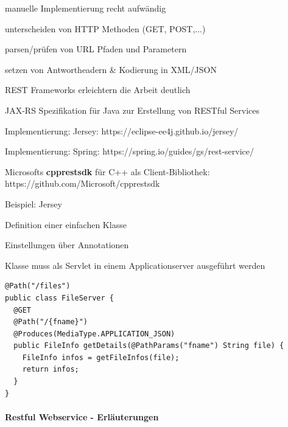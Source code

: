 \documentclass[10pt]{article}
\begin{document}
\begin{itemize*}
  \item manuelle Implementierung recht aufwändig
  \begin{itemize*}
    \item unterscheiden von HTTP Methoden (GET, POST,...)
    \item parsen/prüfen von URL Pfaden und Parametern
    \item setzen von Antwortheadern \& Kodierung in XML/JSON
  \end{itemize*}
  \item REST Frameworks erleichtern die Arbeit deutlich
  \begin{itemize*}
    \item JAX-RS Spezifikation für Java zur Erstellung von RESTful Services
    \begin{itemize*}
      \item Implementierung: Jersey: https://eclipse-ee4j.github.io/jersey/
      \item Implementierung: Spring:
      https://spring.io/guides/gs/rest-service/
    \end{itemize*}
    \item Microsofts \textbf{cpprestsdk} für C++ als Client-Bibliothek:
    https://github.com/Microsoft/cpprestsdk
  \end{itemize*}
\end{itemize*}
\begin{itemize*}
  \item Beispiel: Jersey
  \item Definition einer einfachen Klasse
  \begin{itemize*}
    \item Einstellungen über Annotationen
    \item Klasse muss als Servlet in einem Applicationserver ausgeführt werden
  \end{itemize*}
\end{itemize*}
\begin{lstlisting}
@Path("/files")
public class FileServer {
  @GET
  @Path("/{fname}")
  @Produces(MediaType.APPLICATION_JSON)
  public FileInfo getDetails(@PathParams("fname") String file) {
    FileInfo infos = getFileInfos(file);
    return infos;
  }
}
\end{lstlisting}

\paragraph{Restful Webservice - Erläuterungen}
\end{document}
